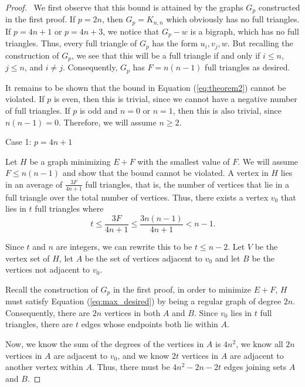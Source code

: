 \documentclass[10pt]{amsart}
\begin{document}
\begin{proof} \
    We first observe that this bound is attained by the graphs $G_p$ constructed in the first 
    proof. If $p = 2n$, then $G_p = K_{n, n}$ which obviously has no full triangles. If 
    $p = 4n +1$ or $p = 4n + 3$, we notice that $G_p - w$ is a bigraph, which has no full triangles.
    Thus, every full triangle of $G_p$ has the form $u_i, v_j, w$. But recalling the construction
    of $G_p$, we see that this will be a full triangle if and only if $i \le n$, $j \le n$, and 
    $i \neq j$. Consequently, $G_p$ has $F = n(n - 1)$ full triangles as desired.

    It remains to be shown that the bound in Equation (\ref{eq:theorem2}) cannot be violated. If 
    $p$ is even, then this is trivial, since we cannot have a negative number of full triangles. If 
    $p$ is odd and $n = 0$ or $n = 1$, then this is also trivial, since $n(n - 1) = 0$. Therefore,
    we will assume $n \ge 2$.

    \noindent Case 1: $p = 4n + 1$

    Let $H$ be a graph minimizing $E + F$ with the smallest value of $F$. We will assume $F \le n(n - 1)$
    and show that the bound cannot be violated. A vertex in $H$ lies in an average of $\frac{3F}{4n + 1}$ 
    full triangles, that is, the number of vertices that lie in a full triangle over the total number
    of vertices. Thus, there exists a vertex $v_0$ that lies in $t$ full triangles where
    \begin{equation}
        t \le \frac{3F}{4n + 1} \le \frac{3n(n - 1)}{4n + 1} < n - 1 \label{eq:t_case_1}.
    \end{equation}

    Since $t$ and $n$ are integers, we can rewrite this to be $t \le n - 2$. Let $V$ be the vertex set 
    of $H$, let $A$ be the set of vertices adjacent to $v_0$ and let $B$ be the vertices not adjacent to
    $v_0$.

    Recall the construction of $G_p$ in the first proof, in order to minimize $E + F$, $H$ must 
    satisfy Equation (\ref{eq:max_desired}) by being a regular graph of degree $2n$. Consequently, 
    there are $2n$ vertices in both $A$ and $B$. Since $v_0$
    lies in $t$ full triangles, there are $t$ edges whose endpoints both lie within $A$.

    Now, we know the sum of the degrees of the vertices in $A$ is $4n^2$, we know all $2n$ 
    vertices in $A$ are adjacent to $v_0$, and we know $2t$ vertices in $A$ are adjacent to 
    another vertex within $A$. Thus, there must be $4n^2 - 2n - 2t$ edges joining sets $A$ and $B$. 
    

\end{proof}
\end{document}
